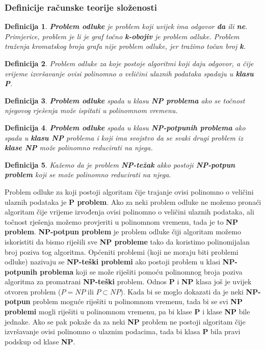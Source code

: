 \documentclass[times, utf8, diplomski, numeric]{fer}
\newtheorem{definition}{Definicija}
\begin{document}
\subsubsection{Definicije računske teorije složenosti}

\begin{definition}
\textbf{Problem odluke} je problem koji uvijek ima odgovor \textbf{da} ili \textbf{ne}. Primjerice, problem je li je graf točno \textbf{k-obojiv} je problem odluke. Problem traženja kromatskog broja grafa nije problem odluke, jer tražimo točan broj \textbf{k}.
\end{definition}

\begin{definition}
Problem odluke za koje postoje algoritmi koji daju odgovor, a čije vrijeme izvršavanje ovisi polinomno o veličini ulaznih podataka spadaju u \textbf{klasu P}.
\end{definition}

\begin{definition}
\textbf{Problem odluke} spada u klasu \textbf{NP problema} ako se točnost njegovog rješenja može ispitati u polinomnom vremenu. 
\end{definition}

\begin{definition}
\textbf{Problem odluke} spada u klasu \textbf{NP-potpunih problema} ako spada u \textbf{klasu NP} problema i koji ima svojstvo da se svaki drugi problem iz \textbf{klase NP} može polinomno reducirati na njega. 
\end{definition}

\begin{definition}
Kažemo da je problem \textbf{NP-težak} akko postoji \textbf{NP-potpun problem} koji se može polinomno reducirati na njega.
\end{definition}

Problem odluke za koji postoji algoritam čije trajanje ovisi polinomno o veličini ulaznih podataka je \textbf{P problem}. Ako za neki problem odluke ne možemo pronaći algoritam čije vrijeme izvođenja ovisi polinomno o veličini ulaznih podataka, ali točnost rješenja možemo provjeriti u polinomnom vremenu, tada je to \textbf{NP problem}. \textbf{NP-potpun problem} je problem odluke čiji algoritam možemo iskoristiti da bismo riješili sve \textbf{NP probleme} tako da koristimo polinomijalan broj poziva tog algoritma. Općeniti problemi (koji ne moraju biti problemi odluke) nazivaju se \textbf{NP-teški problemi} ako postoji problem u klasi \textbf{NP-potpunih problema} koji se može riješiti pomoću polinomnog broja poziva algoritma za promatrani \textbf{NP-teški} problem. Odnos \textbf{P} i \textbf{NP} klasa još je uvijek otvoren problem ($P=NP$ ili $P\subset NP$). Kada bi se moglo dokazati da je neki \textbf{NP-potpun} problem moguće riješiti u polinomnom vremenu, tada bi se svi \textbf{NP problemi} mogli riješiti u polinomnom vremenu, pa bi klase \textbf{P} i klase \textbf{NP} bile jednake. Ako se pak pokaže da za neki \textbf{NP} problem ne postoji algoritam čije izvršavanje ovisi polinomno o ulaznim podacima, tada bi klasa \textbf{P} bila pravi podskup od klase \textbf{NP}.
\end{document}
